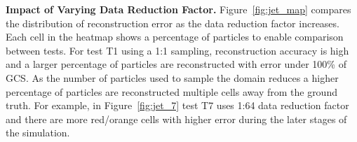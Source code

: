 \textbf{Impact of Varying Data Reduction Factor.} Figure~\ref{fig:jet_map} compares the distribution of reconstruction error as the data reduction factor increases. 
%
Each cell in the heatmap shows a percentage of particles to enable comparison between tests.
%
For test T1 using a 1:1 sampling, reconstruction accuracy is high and a larger percentage of particles are reconstructed with error under 100\% of GCS.
%
As the number of particles used to sample the domain reduces a higher percentage of particles are reconstructed multiple cells away from the ground truth. 
%
For example, in Figure~\ref{fig:jet_7} test T7 uses 1:64 data reduction factor and there are more red/orange cells with higher error during the later stages of the simulation. 
%
%
%
%

